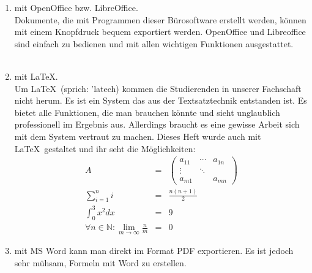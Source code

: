 \begin{enumerate}
    \item mit OpenOffice bzw. LibreOffice.\\
          Dokumente, die mit Programmen dieser Bürosoftware erstellt werden, können mit einem Knopfdruck bequem exportiert werden.
          OpenOffice und Libreoffice sind einfach zu bedienen und mit allen wichtigen Funktionen ausgestattet.\\
          \\
    \item mit \LaTeX.\\
          Um \LaTeX~(sprich: 'latech) kommen die Studierenden in unserer Fachschaft nicht herum. 
          Es ist ein System das aus der Textsatztechnik entstanden ist.
          Es bietet alle Funktionen, die man brauchen könnte und sieht unglaublich professionell im Ergebnis aus.
          Allerdings braucht es eine gewisse Arbeit sich mit dem System vertraut zu machen.
          Dieses Heft wurde auch mit \LaTeX~gestaltet und ihr seht die Möglichkeiten:
          \begin{eqnarray*}
               A & = & \left(\begin{array}{ccc} a_{11} & \cdots & a_{1n}\\
                                                    \vdots & \ddots & \\
                                                   a_{m1} &        & a_{mn} \end{array}\right)\\
               \sum_{i=1}^n i & = & \frac{n(n+1)}{2}\\
               \int_{0}^{3}x^2dx & = & 9\\
               \forall n\in\mathbb{N}:\lim
                                  \limits_{m\to \infty}\frac{n}{m} & = & 0
          \end{eqnarray*}
    \item mit MS Word kann man direkt im Format PDF exportieren. Es ist jedoch sehr mühsam, Formeln mit Word zu erstellen.
\end{enumerate}

